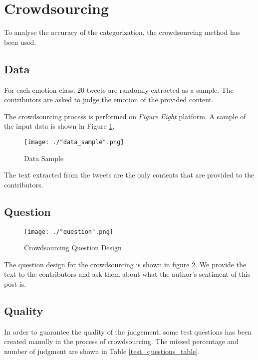 \section{Crowdsourcing}

To analyse the accuracy of the categorization, the crowdsourcing method has been used.

\subsection{Data}
For each emotion class, 20 tweets are randomly extracted as a sample. The contributors are asked to judge the emotion of the provided content.

The crowdsourcing process is performed on \textit{Figure Eight} platform. A sample of the input data is shown in Figure \ref{data_sample}.

\begin{figure}[ht]
    \centering
    \texttt{[image: ./"data\_sample".png]}
    \caption{Data Sample}
    \label{data_sample}
\end{figure}

The text extracted from the tweets are the only contents that are provided to the contributors. 

\subsection{Question}

\begin{figure}[ht]
    \centering
    \texttt{[image: ./"question".png]}
    \caption{Crowdsourcing Question Design}
    \label{question}
\end{figure}

The question design for the crowdsourcing is shown in figure \ref{question}. We provide the text to the contributors and ask them about what the author's sentiment of this post is.

\subsection{Quality}

In order to guarantee the quality of the judgement, some test questions has been created manully in the process of crowdsourcing. The missed percentage and number of judgment are shown in Table \ref{test_questions_table}.

